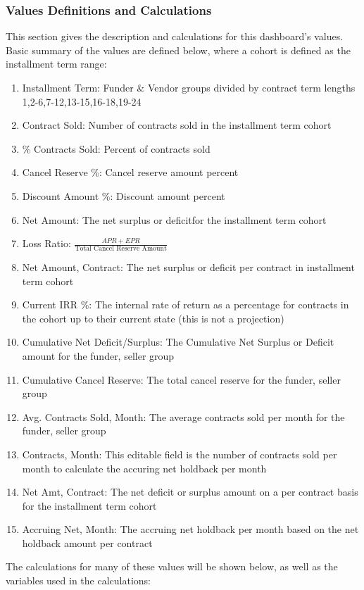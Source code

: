 \documentclass[titlepage]{article}
\begin{document}
\subsubsection{Values Definitions and Calculations}
This section gives the description and calculations for this dashboard's values. Basic summary of the values are defined below, where a cohort is defined as the installment term range:
\begin{enumerate}
	\item Installment Term: Funder \& Vendor groups divided by contract term lengths 1,2-6,7-12,13-15,16-18,19-24
	\item Contract Sold: Number of contracts sold in the installment term cohort
	\item \% Contracts Sold:  Percent of contracts sold
	\item Cancel Reserve \%: Cancel reserve amount percent
	\item Discount Amount \%: Discount amount percent
	\item Net Amount: The net surplus or deficitfor the installment term cohort
	\item Loss Ratio: $\frac{APR + EPR}{\text{Total Cancel Reserve Amount}}$
	\item Net Amount, Contract: The net surplus or deficit per contract in installment term cohort
	\item Current IRR \%: The internal rate of return as a percentage for contracts in the cohort up to their current state (this is not a projection)
	\item Cumulative Net Deficit/Surplus: The Cumulative Net Surplus or Deficit amount for the funder, seller group
	\item Cumulative Cancel Reserve: The total cancel reserve for the funder, seller group
	\item Avg. Contracts Sold, Month: The average contracts sold per month for the funder, seller group
	\item Contracts, Month: This editable field is the number of contracts sold per month to calculate the accuring net holdback per month
	\item Net Amt, Contract: The net deficit or surplus amount on a per contract basis for the installment term cohort
	\item Accruing Net, Month: The accruing net holdback per month based on the net holdback amount per contract
\end{enumerate}
The calculations for many of these values will be shown below, as well as the variables used in the calculations:
\end{document}
